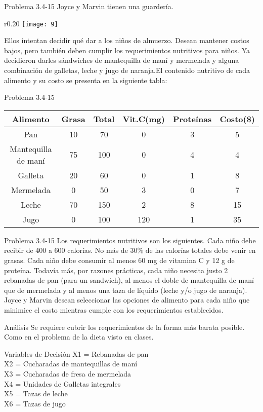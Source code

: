 \documentclass{beamer}
\begin{document}
\begin{frame}[t,fragile]{Problema 3.4-15 }
Joyce y Marvin tienen una guardería. \begin{wrapfigure}{r}{0.20\textwidth}
    \centering
    \texttt{[image: 9]}
\end{wrapfigure} Ellos intentan decidir qué dar a los niños de almuerzo. Desean mantener costos bajos, pero también deben cumplir los requerimientos nutritivos para niños. Ya decidieron darles sándwiches de mantequilla de maní y mermelada  y alguna combinación de galletas, leche y jugo de naranja.El contenido nutritivo de cada alimento y su costo se presenta en la siguiente tabla:\\
\end{frame}
\begin{frame}[t,fragile]{Problema 3.4-15 }
\begin{tabular}{|c|c|c|c|c|c|}
\hline 
Alimento & Grasa & Total & Vit.C(mg) & Proteínas & Costo(\$) \\ 
\hline 
Pan& 10 & 70 & 0 & 3 & 5 \\ 
\hline 
Mantequilla de maní& 75 & 100 & 0 & 4 & 4 \\ 
\hline 
Galleta  & 20 & 60 & 0 & 1 & 8 \\ 
\hline 
Mermelada  & 0 & 50 & 3 & 0 & 7 \\ 
\hline 
Leche  & 70 & 150 & 2 & 8 & 15 \\ 
\hline 
Jugo  & 0 & 100 & 120 & 1 & 35 \\ 
\hline 
\end{tabular}
\end{frame}
\begin{frame}[t,fragile]{Problema 3.4-15 }
Los requerimientos nutritivos son los siguientes. Cada niño debe recibir de 400 a 600 calorías. No más de 30\% de las calorías totales debe venir en grasas. Cada niño debe consumir al menos 60 mg de vitamina C y 12 g de proteína. Todavía más, por razones prácticas, cada niño necesita justo 2 rebanadas de pan (para un sandwich), al menos el doble de mantequilla de maní que de mermelada y al menos una taza de líquido (leche y/o jugo de naranja). 
Joyce y Marvin desean seleccionar las opciones de alimento para cada niño que minimice el costo mientras cumple con los requerimientos establecidos.


\end{frame}
\begin{frame}[fragile]{Análisis}
Se requiere cubrir los requerimientos de la forma más barata posible. Como en el problema de la dieta visto en clases.

\end{frame}
\begin{frame}[fragile]{Variables de Decisión}
X1 = Rebanadas de pan\\
X2 = Cucharadas de mantequillas de maní\\
X3 = Cucharadas de fresa de mermelada\\
X4 = Unidades de Galletas integrales\\
X5 = Tazas de leche\\
X6 = Tazas de jugo\\

\end{frame}
\end{document}
